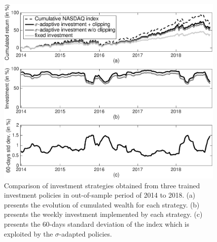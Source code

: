 \documentclass[]{interact}
\theoremstyle{plain}%
\theoremstyle{definition}
\theoremstyle{remark}
\newcommand{\0}{\V{0}}
\newcommand{\1}{\V{1}}
\theoremstyle{plain}
\theoremstyle{definition}
\begin{document}
\begin{figure}[h]
\begin{centering}\includegraphics[width=1\columnwidth]{InvestmentGrowth}
\end{centering}
\caption{Comparison of investment strategies obtained from three trained investment policies in out-of-sample period of 2014 to 2018. (a) presents the evolution of cumulated wealth for each strategy. (b) presents the weekly investment implemented by each strategy. (c) presents the 60-days standard deviation of the index which is exploited by the $\sigma$-adapted policies.}
\label{fig:growth}
\end{figure}
\end{document}
